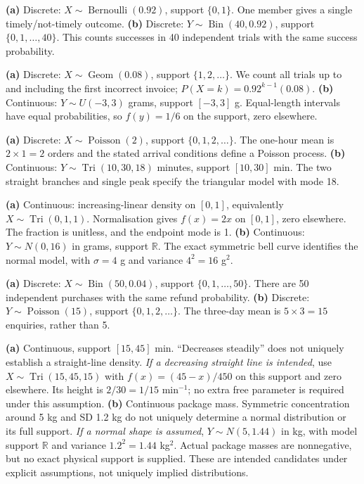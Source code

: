 \textbf{(a)} Discrete: $X\sim\operatorname{Bernoulli}(0.92)$, support $\{0,1\}$. One member gives a single timely/not-timely outcome.
\textbf{(b)} Discrete: $Y\sim\operatorname{Bin}(40,0.92)$, support $\{0,1,\ldots,40\}$. This counts successes in 40 independent trials with the same success probability.

\textbf{(a)} Discrete: $X\sim\operatorname{Geom}(0.08)$, support $\{1,2,\ldots\}$. We count all trials up to and including the first incorrect invoice; $P(X=k)=0.92^{k-1}(0.08)$.
\textbf{(b)} Continuous: $Y\sim U(-3,3)$ grams, support $[-3,3]$ g. Equal-length intervals have equal probabilities, so $f(y)=1/6$ on the support, zero elsewhere.

\textbf{(a)} Discrete: $X\sim\operatorname{Poisson}(2)$, support $\{0,1,2,\ldots\}$. The one-hour mean is $2\times1=2$ orders and the stated arrival conditions define a Poisson process.
\textbf{(b)} Continuous: $Y\sim\operatorname{Tri}(10,30,18)$ minutes, support $[10,30]$ min. The two straight branches and single peak specify the triangular model with mode 18.

\textbf{(a)} Continuous: increasing-linear density on $[0,1]$, equivalently $X\sim\operatorname{Tri}(0,1,1)$. Normalisation gives $f(x)=2x$ on $[0,1]$, zero elsewhere. The fraction is unitless, and the endpoint mode is 1.
\textbf{(b)} Continuous: $Y\sim N(0,16)$ in grams, support $\mathbb R$. The exact symmetric bell curve identifies the normal model, with $\sigma=4$ g and variance $4^2=16$ g$^2$.

\textbf{(a)} Discrete: $X\sim\operatorname{Bin}(50,0.04)$, support $\{0,1,\ldots,50\}$. There are 50 independent purchases with the same refund probability.
\textbf{(b)} Discrete: $Y\sim\operatorname{Poisson}(15)$, support $\{0,1,2,\ldots\}$. The three-day mean is $5\times3=15$ enquiries, rather than 5.

\textbf{(a)} Continuous, support $[15,45]$ min. ``Decreases steadily'' does not uniquely establish a straight-line density. \emph{If a decreasing straight line is intended}, use $X\sim\operatorname{Tri}(15,45,15)$ with $f(x)=(45-x)/450$ on this support and zero elsewhere. Its height is $2/30=1/15$ min$^{-1}$; no extra free parameter is required under this assumption.
\textbf{(b)} Continuous package mass. Symmetric concentration around 5 kg and SD 1.2 kg do not uniquely determine a normal distribution or its full support. \emph{If a normal shape is assumed}, $Y\sim N(5,1.44)$ in kg, with model support $\mathbb R$ and variance $1.2^2=1.44$ kg$^2$. Actual package masses are nonnegative, but no exact physical support is supplied. These are intended candidates under explicit assumptions, not uniquely implied distributions.

